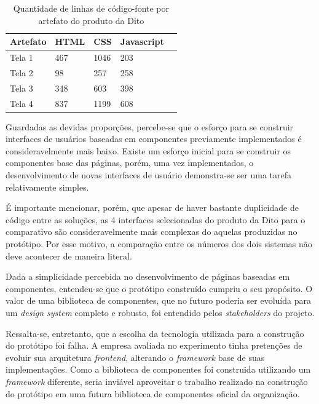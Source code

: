 \begin{table}
\centering
\begin{tabular}{|m{3cm}|m{1cm}|m{1cm}|m{1cm}|m{1cm}|} \hline
	
	\multicolumn{1}{|c|}{\bfseries Artefato} & \multicolumn{1}{c|}{\bfseries HTML} & \multicolumn{1}{c|}{\bfseries CSS} & \multicolumn{1}{c|}{\bfseries Javascript} \\\hline
	 Tela 1 & 467 & 1046 & 203 \\\hline
	 Tela 2 & 98 & 257 & 258 \\\hline
	 Tela 3 & 348 & 603 & 398  \\\hline
	 Tela 4 & 837 & 1199 & 608 \\\hline
    
\end{tabular}
\caption{Quantidade de linhas de código-fonte por artefato do produto da Dito}
\label{table:lineCountDito}
\end{table}

Guardadas as devidas proporções, percebe-se que o esforço para se construir interfaces de usuários baseadas em componentes previamente implementados é consideravelmente mais baixo. Existe um esforço inicial para se construir os componentes base das páginas, porém, uma vez implementados, o desenvolvimento de novas interfaces de usuário demonstra-se ser uma tarefa relativamente simples.

É importante mencionar, porém, que apesar de haver bastante duplicidade de código entre as soluções, as 4 interfaces selecionadas do produto da Dito para o comparativo são consideravelmente mais complexas do aquelas produzidas no protótipo. Por esse motivo, a comparação entre os números dos dois sistemas não deve acontecer de maneira literal.

Dada a simplicidade percebida no desenvolvimento de páginas baseadas em componentes, entendeu-se que o protótipo construído cumpriu o seu propósito. O valor de uma biblioteca de componentes, que no futuro poderia ser evoluída para um \textit{design system} completo e robusto, foi entendido pelos \textit{stakeholders} do projeto.

Ressalta-se, entretanto, que a escolha da tecnologia utilizada para a construção do protótipo foi falha. A empresa avaliada no experimento tinha pretenções de evoluir sua arquitetura \textit{frontend}, alterando o \textit{framework} base de suas implementações. Como a biblioteca de componentes foi construida utilizando um \textit{framework} diferente, seria inviável aproveitar o trabalho realizado na construção do protótipo em uma futura biblioteca de componentes oficial da organização.

